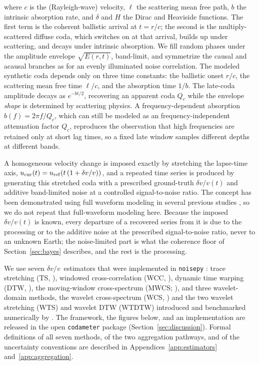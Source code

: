 \documentclass[
  referee]{gji}
\providecommand{\dvv}{\ensuremath{\delta v/v}}
\begin{document}
where \(c\) is the (Rayleigh-wave) velocity, \(\ell\) the scattering
mean free path, \(b\) the intrinsic absorption rate, and \(\delta\) and
\(H\) the Dirac and Heaviside functions. The first term is the coherent
ballistic arrival at \(t=r/c\); the second is the multiply-scattered
diffuse coda, which switches on at that arrival, builds up under
scattering, and decays under intrinsic absorption. We fill random phases
under the amplitude envelope \(\sqrt{E(r,t)}\), band-limit, and
symmetrize the causal and acausal branches as for an evenly illuminated
noise correlation. The modeled synthetic coda depends only on three time
constants: the ballistic onset \(r/c\), the scattering mean free time
\(\ell/c\), and the absorption time \(1/b\). The late-coda amplitude
decays as \(e^{-b t/2}\), recovering an apparent coda \(Q_c\) while the
envelope \emph{shape} is determined by scattering physics. A
frequency-dependent absorption \(b(f)=2\pi f/Q_c\), which can still be
modeled as an frequency-independent attenuation factor \(Q_c\),
reproduces the observation that high frequencies are retained only at
short lag times, so a fixed late window samples different depths at
different bands.

A homogeneous velocity change is imposed exactly by stretching the
lapse-time axis,
\(u_{\rm cur}(t) = u_{\rm ref}\!\left(t\,(1+\dvv)\right)\), and a
repeated time series is produced by generating this stretched coda with
a prescribed ground-truth \(\dvv(t)\) and additive band-limited noise at
a controlled signal-to-noise ratio. The concept has been demonstrated
using full waveform modeling in several previous studies
\citep{Obermann2013, Obermann2016, Yuan2021}, so we do not repeat that
full-waveform modeling here. Because the imposed \(\dvv(t)\) is known,
every departure of a recovered series from it is due to the processing
or to the additive noise at the prescribed signal-to-noise ratio, never
to an unknown Earth; the noise-limited part is what the coherence floor
of Section~\ref{sec:bayes} describes, and the rest is the processing.

We use seven \dvv~estimators that were implemented in \texttt{noisepy}
\citep{Jiang2020}: trace stretching (TS, \citet{lobkis03}), windowed
cross-correlation (WCC, \citet{poupinet84}), dynamic time warping (DTW,
\citet{Mikesell2015}), the moving-window cross-spectrum (MWCS;
\citet{Clarke2011}), and three wavelet-domain methods, the wavelet
cross-spectrum (WCS, \citet{Mao2020}) and the two wavelet stretching
(WTS) and wavelet DTW (WTDTW) introduced and benchmarked numerically by
\citet{Yuan2021}. The framework, the figures below, and an
implementation are released in the open \texttt{codameter} package
(Section~\ref{sec:discussion}). Formal definitions of all seven methods,
of the two aggregation pathways, and of the uncertainty conventions are
described in Appendices~\ref{app:estimators} and~\ref{app:aggregation}.
\end{document}
